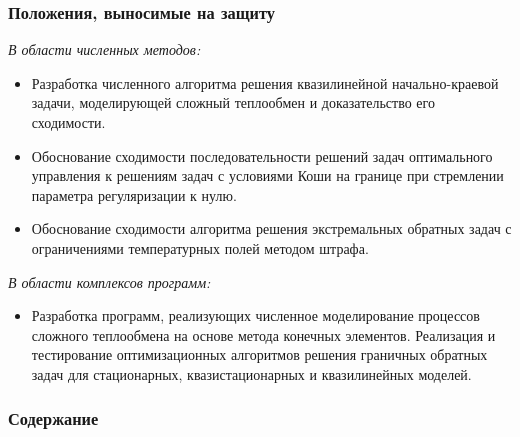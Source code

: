 \begin{frame}
    \frametitle{Положения, выносимые на защиту}
    \textit{В области численных методов:}
    \begin{itemize}
        \item Разработка численного алгоритма решения квазилинейной начально-краевой задачи,
        моделирующей сложный теплообмен и доказательство
        его сходимости.
        \item Обоснование сходимости последовательности решений задач оптимального
        управления к решениям задач с условиями Коши на границе при
        стремлении параметра регуляризации к нулю.
        \item Обоснование сходимости алгоритма решения экстремальных обратных
        задач с ограничениями температурных полей методом штрафа.
    \end{itemize}

    \textit{В области комплексов программ:}
    \begin{itemize}
        \item Разработка программ, реализующих численное моделирование процессов
        сложного теплообмена на основе метода конечных элементов.
        Реализация и тестирование оптимизационных алгоритмов решения
        граничных обратных задач для стационарных, квазистационарных и
        квазилинейных моделей.
    \end{itemize}
\end{frame}

\begin{frame}
    \frametitle{Содержание}
    \tableofcontents
\end{frame}
